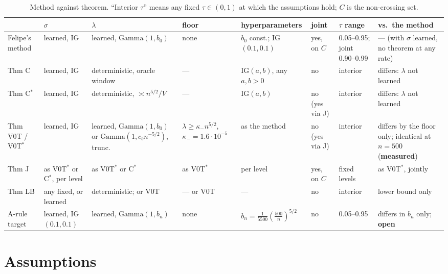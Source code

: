 \documentclass[11pt]{article}
\newcommand{\Ga}{\mathrm{Gamma}}
\newcommand{\OP}{\textcolor{open}{\textbf{open}}}
\newcommand{\ME}{\textbf{measured}}
\theoremstyle{plain}
\begin{document}
\begin{table}[h]
\centering\footnotesize
\caption{Method against theorem. ``Interior $\tau$'' means any fixed $\tau\in(0,1)$ at which the assumptions hold; $C$ is the non-crossing set.}
\label{tab:method}
\setlength{\tabcolsep}{3pt}
\begin{tabular}{@{}p{2.0cm}p{1.4cm}p{2.7cm}p{1.9cm}p{2.0cm}p{1.1cm}p{1.5cm}p{2.3cm}@{}}
\toprule
 & $\sigma$ & $\lambda$ & floor & hyper\-parameters & joint & $\tau$ range & vs.\ the method \\
\midrule
Felipe's method & learned, IG & learned, $\Ga(1,b_0)$ & none & $b_0$ const.; IG$(0.1,0.1)$ & yes, on $C$ & 0.05--0.95; joint 0.90--0.99 & --- (with $\sigma$ learned, no theorem at any rate) \\[2pt]
Thm C & learned, IG & deterministic, oracle window & --- & IG$(a,b)$, any $a,b>0$ & no & interior & differs: $\lambda$ not learned \\[2pt]
Thm C$^*$ & learned, IG & deterministic, $\asymp n^{5/2}/V$ & --- & IG$(a,b)$ & no (yes via J) & interior & differs: $\lambda$ not learned \\[2pt]
Thm V0T / V0T$^*$ & learned, IG & learned, $\Ga(1,b_0)$ or $\Ga(1,c_bn^{-5/2})$, trunc. & $\lambda\ge\kappa_-n^{5/2}$, $\kappa_-{=}1.6{\cdot}10^{-5}$ & as the method & no (yes via J) & interior & differs by the floor only; identical at $n=500$ (\ME) \\[2pt]
Thm J & as V0T$^*$ or C$^*$, per level & as V0T$^*$ or C$^*$ & as V0T$^*$ & per level & yes, on $C$ & fixed levels & as V0T$^*$, jointly \\[2pt]
Thm LB & any fixed, or learned & deterministic; or V0T & --- or V0T & --- & no & interior & lower bound only \\[2pt]
A-rule target & learned, IG$(0.1,0.1)$ & learned, $\Ga(1,b_n)$ & none & $b_n=\frac{1}{5500}(\frac{500}{n})^{5/2}$ & no & 0.05--0.95 & differs in $b_n$ only; \OP \\
\bottomrule
\end{tabular}
\end{table}

\section{Assumptions}
\label{sec:assumptions}
\end{document}
